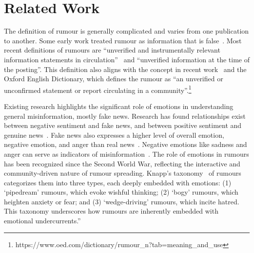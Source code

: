 \section{Related Work}
The definition of rumour is generally complicated and varies from one publication to another. Some early work treated rumour as information that is false~\citep{rumour_chinese2014}. Most recent definitions of rumours are ``unverified and instrumentally relevant information statements in circulation''~\citep{DiFonzo_Bordia_2007} and ``unverified information at the time of the posting''. This definition also aligns with the concept in recent work~\citep{rumour_survey2018, pheme2015, tian-etal-2022-duck} and the Oxford English Dictionary, which defines the rumour as ``an unverified or unconfirmed statement or report circulating in a community''.\footnote{https://www.oed.com/dictionary/rumour\_n?tab=meaning\_and\_use}

Existing research highlights the significant role of emotions in understanding general misinformation, mostly fake news. Research has found relationships exist between negative sentiment and fake news, and between positive sentiment and genuine news~\citep{Zaeem2020OnSO}. Fake news also expresses a higher level of overall emotion, negative emotion, and anger than real news~\citep{Zhou2022DoesFN}. Negative emotions like sadness and anger can serve as indicators of misinformation~\citep{Prabhala2019DoED}. The role of emotions in rumours has been recognized since the Second World War, reflecting the interactive and community-driven nature of rumour spreading. Knapp’s taxonomy~\citep{Knapp1944APO} of rumours categorizes them into three types, each deeply embedded with emotions: (1) ‘pipedream’ rumours, which evoke wishful thinking; (2) ‘bogy’ rumours, which heighten anxiety or fear; and (3) ‘wedge-driving’ rumours, which incite hatred. This taxonomy underscores how rumours are inherently embedded with emotional undercurrents.”

